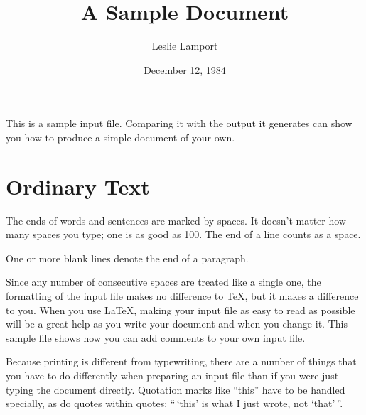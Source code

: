 
\title{A Sample Document}  %
\author{Leslie Lamport}    %
\date{December 12, 1984}   %


\maketitle                 %

This is a sample input file.  Comparing it with the output it 
generates can show you how to produce a simple document of 
your own.
\section{Ordinary Text}  %

The ends  of words and sentences are marked 
  by   spaces. It  doesn't matter how many 
spaces    you type; one is as good as 100.  The 
end of   a line counts as a space.

One   or more   blank lines denote the  end 
of  a paragraph.

Since any number of consecutive spaces are treated like a single 
one, the formatting of the input file makes no difference to 
      \TeX,         %
but it makes a difference to you. 
When you use 
      \LaTeX,       %
making your input file as easy to read as possible 
will be a great help as you write your document and when you 
change it.  This sample file shows how you can add comments to 
your own input file.

Because printing is different from typewriting, there are a 
number of things that you have to do differently when preparing 
an input file than if you were just typing the document directly. 
Quotation marks like 
       ``this'' 
have to be handled specially, as do quotes within quotes: 
       ``\,`this' %
        is what I just 
        wrote, not  `that'\,''.

